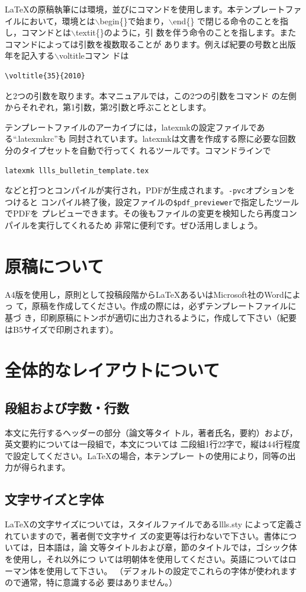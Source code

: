 \documentclass[b5paper,10pt,twocolumn,tombow]{jarticle}
\begin{document}
\LaTeX{}の原稿執筆には環境，並びにコマンドを使用します。本テンプレートファ
イルにおいて，環境とは$\backslash$begin\{\}で始まり，$\backslash$end\{\}
で閉じる命令のことを指し，コマンドとは$\backslash$textit\{\}のように，引
数を伴う命令のことを指します。またコマンドによっては引数を複数取ることが
あります。例えば紀要の号数と出版年を記入する$\backslash$voltitleコマン
ドは
\begin{verbatim}
\voltitle{35}{2010}
\end{verbatim}
と2つの引数を取ります。本マニュアルでは，この2つの引数をコマンド
の左側からそれぞれ，第1引数，第2引数と呼ぶこととします。

テンプレートファイルのアーカイブには，latexmkの設定ファイルである``.latexmkrc''も
同封されています。latexmkは文書を作成する際に必要な回数分のタイプセットを自動で行ってく
れるツールです。コマンドラインで
\begin{verbatim}
latexmk llls_bulletin_template.tex
\end{verbatim}
などと打つとコンパイルが実行され，PDFが生成されます。\verb|-pvc|オプションをつけると
コンパイル終了後，設定ファイルの\verb|$pdf_previewer|で指定したツールでPDFを
プレビューできます。その後もファイルの変更を検知したら再度コンパイルを実行してくれるため
非常に便利です。ぜひ活用しましょう。

\section{原稿について}
A4版を使用し，原則として投稿段階から\LaTeX{}あるいはMicrosoft社のWordによっ
て，原稿を作成してください。作成の際には，必ずテンプレートファイルに基づ
き，印刷原稿にトンボが適切に出力されるように，作成して下さい（紀要
はB5サイズで印刷されます）。

\section{全体的なレイアウトについて}
\subsection{段組および字数・行数}

本文に先行するヘッダーの部分（論文等タイ
トル，著者氏名，要約）および，英文要約については一段組で，本文については
二段組1行22字で，縦は44行程度で設定してください。\LaTeX{}の場合，本テンプレー
トの使用により，同等の出力が得られます。


\subsection{文字サイズと字体}
\LaTeX{}の文字サイズについては，スタイルファイルであるllls.sty
によって定義されていますので，著者側で文字サイ
ズの変更等は行わないで下さい。書体については，日本語は，論
文等タイトルおよび章，節のタイトルでは，ゴシック体を使用し，それ以外につ
いては明朝体を使用してください。英語についてはローマン体を使用して下さい。
（デフォルトの設定でこれらの字体が使われますので通常，特に意識する必
要はありません。）
\end{document}
